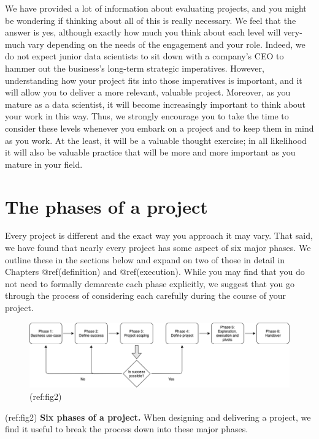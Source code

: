 \documentclass[
]{book}
\begin{document}
We have provided a lot of information about evaluating projects, and you
might be wondering if thinking about all of this is really necessary. We
feel that the answer is yes, although exactly how much you think about
each level will very-much vary depending on the needs of the engagement
and your role. Indeed, we do not expect junior data scientists to sit
down with a company's CEO to hammer out the business's long-term
strategic imperatives. However, understanding how your project fits into
those imperatives is important, and it will allow you to deliver a more
relevant, valuable project. Moreover, as you mature as a data scientist,
it will become increasingly important to think about your work in this
way. Thus, we strongly encourage you to take the time to consider these
levels whenever you embark on a project and to keep them in mind as you
work. At the least, it will be a valuable thought exercise; in all
likelihood it will also be valuable practice that will be more and more
important as you mature in your field.

\hypertarget{phases}{%
\chapter{The phases of a project}\label{phases}}

Every project is different and the exact way you approach it may vary.
That said, we have found that nearly every project has some aspect of
six major phases. We outline these in the sections below and expand on
two of those in detail in Chapters @ref(definition) and @ref(execution).
While you may find that you do not need to formally demarcate each phase
explicitly, we suggest that you go through the process of considering
each carefully during the course of your project.

\begin{smaller}

\begin{figure}
\includegraphics[width=1\linewidth]{figures/Figure_2-phases} \caption{(ref:fig2)}\label{fig:bottom-fig}
\end{figure}

(ref:fig2) \textbf{Six phases of a project.} When designing and
delivering a project, we find it useful to break the process down into
these major phases.

\end{smaller}
\end{document}

